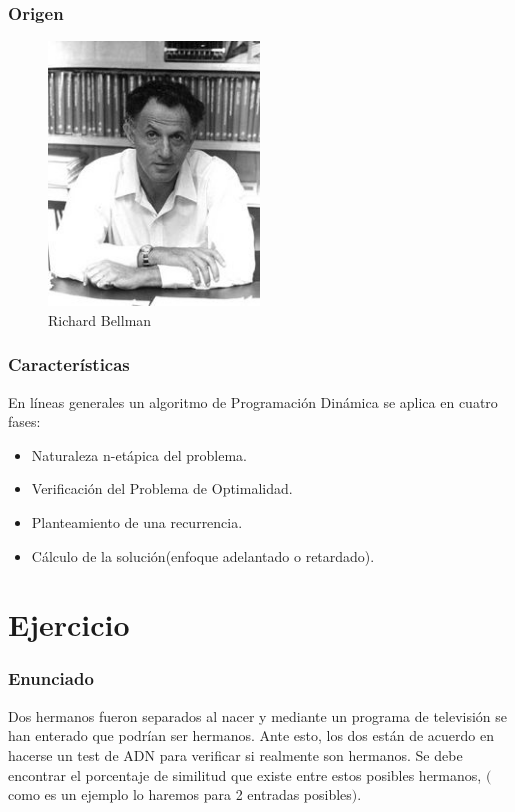 \documentclass[13pt]{beamer}
\begin{document}
    \begin{frame}
		\frametitle{Origen}
            \begin{figure}[H] 
                \centering
                \includegraphics[width=0.5\textwidth]{bellman.jpg}
                \caption{Richard Bellman}
            \end{figure}
    \end{frame}

	\begin{frame}
		\frametitle{Características}
        En líneas generales un algoritmo de Programación Dinámica se aplica en cuatro fases:
        \begin{itemize}
        \item Naturaleza n-etápica del problema.
        \item Verificación del Problema de Optimalidad.
        \item Planteamiento de una recurrencia.
        \item Cálculo de la solución(enfoque adelantado o retardado). 
        \end{itemize}
	\end{frame}

	\section{Ejercicio}

    \begin{frame}
        \frametitle{Enunciado}
        Dos hermanos fueron separados al nacer y mediante un programa de televisión se han
        enterado que podrían ser hermanos. Ante esto, los dos están de acuerdo en hacerse un test de
        ADN para verificar si realmente son hermanos. Se debe encontrar el porcentaje de similitud que existe 
        entre estos posibles hermanos, $($como es un ejemplo lo haremos para 2 entradas posibles$)$.
    \end{frame}
\end{document}
